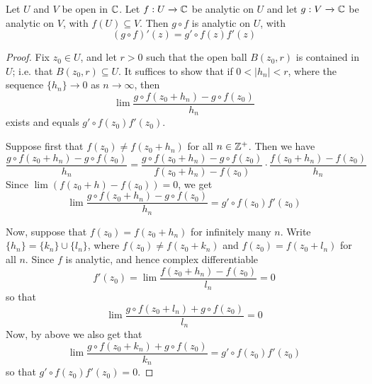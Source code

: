 \begin{theorem}\label{3.2.3}
    Let $U$ and  $V$ be open in $\mathbb{C}$. Let $f:U \xrightarrow{} \mathbb{C}$ be analytic on
    $U$ and let  $g:V \xrightarrow{} \mathbb{C}$ be analytic on $V$, with  $f(U)
    \subseteq V$. Then $g \circ f$ is analytic on $U$, with
    \begin{equation*}
        (g \circ f)'(z)=g' \circ f(z)f'(z)
    \end{equation*}
\end{theorem}
\begin{proof}
    Fix $z_0 \in U$, and let $r>0$ such that the open ball $B(z_0,r)$ is
    contained in $U$; i.e. that  $B(z_0,r) \subseteq U$. It suffices to show that
    if $0<|h_n|<r$, where the sequence $\{h_n\} \xrightarrow{} 0$ as $n
    \xrightarrow{} \infty$, then
    \begin{equation*}
        \lim{\frac{g \circ f(z_0+h_n)-g \circ f(z_0)}{h_n}}
    \end{equation*}
    exists and equals $g' \circ f(z_0)f'(z_0)$.

    Suppose first that $f(z_0) \neq f(z_0+h_n)$ for all $n \in \mathbb{Z}^+$. Then we
    have
    \begin{equation*}
        \frac{g \circ f(z_0+h_n)-g \circ f(z_0)}{h_n}=
        \frac{g \circ f(z_0+h_n)-g \circ f(z_0)}{f(z_0+h_n)-f(z_0)} \cdot
        \frac{f(z_0+h_n)-f(z_0)}{h_n}
    \end{equation*}
    Since $\lim{(f(z_0+h)-f(z_0))}=0$, we get
    \begin{equation*}
        \lim{\frac{g \circ f(z_0+h_n)-g \circ f(z_0)}{h_n}}=g' \circ f(z_0)f'(z_0)
    \end{equation*}

    Now, suppose that $f(z_0)=f(z_0+h_n)$ for infinitely many $n$. Write
    $\{h_n\}=\{k_n\} \cup \{l_n\}$, where $f(z_0) \neq f(z_0+k_n)$ and
    $f(z_0)=f(z_0+l_n)$ for all $n$. Since $f$ is analytic, and hence complex
    differentiable
    \begin{equation*}
        f'(z_0)=\lim{\frac{f(z_0+h_n)-f(z_0)}{l_n}}=0
    \end{equation*}
    so that
    \begin{equation*}
        \lim{\frac{g \circ f(z_0+l_n)+g \circ f(z_0)}{l_n}}=0
    \end{equation*}
    Now, by above we also get that
    \begin{equation*}
        \lim{\frac{g \circ f(z_0+k_n)+g \circ f(z_0)}{k_n}}=g' \circ f(z_0)f'(z_0)
    \end{equation*}
    so that $g' \circ f(z_0)f'(z_0)=0$.
\end{proof}

